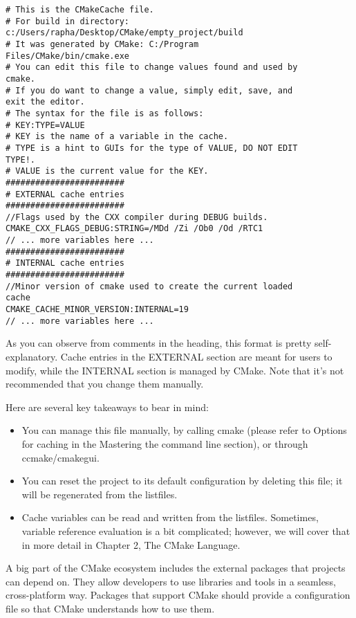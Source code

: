 \begin{lstlisting}[style=styleCMake]
# This is the CMakeCache file.
# For build in directory:
c:/Users/rapha/Desktop/CMake/empty_project/build
# It was generated by CMake: C:/Program
Files/CMake/bin/cmake.exe
# You can edit this file to change values found and used by
cmake.
# If you do want to change a value, simply edit, save, and
exit the editor.
# The syntax for the file is as follows:
# KEY:TYPE=VALUE
# KEY is the name of a variable in the cache.
# TYPE is a hint to GUIs for the type of VALUE, DO NOT EDIT
TYPE!.
# VALUE is the current value for the KEY.
########################
# EXTERNAL cache entries
########################
//Flags used by the CXX compiler during DEBUG builds.
CMAKE_CXX_FLAGS_DEBUG:STRING=/MDd /Zi /Ob0 /Od /RTC1
// ... more variables here ...
########################
# INTERNAL cache entries
########################
//Minor version of cmake used to create the current loaded
cache
CMAKE_CACHE_MINOR_VERSION:INTERNAL=19
// ... more variables here ...
\end{lstlisting}

As you can observe from comments in the heading, this format is pretty self-explanatory. Cache entries in the EXTERNAL section are meant for users to modify, while the INTERNAL section is managed by CMake. Note that it's not recommended that you change them manually.

Here are several key takeaways to bear in mind:

\begin{itemize}
\item 
You can manage this file manually, by calling cmake (please refer to Options for caching in the Mastering the command line section), or through ccmake/cmakegui.

\item 
You can reset the project to its default configuration by deleting this file; it will be regenerated from the listfiles.

\item 
Cache variables can be read and written from the listfiles. Sometimes, variable reference evaluation is a bit complicated; however, we will cover that in more detail in Chapter 2, The CMake Language.
\end{itemize}


A big part of the CMake ecosystem includes the external packages that projects can depend on. They allow developers to use libraries and tools in a seamless, cross-platform way. Packages that support CMake should provide a configuration file so that CMake understands how to use them.

